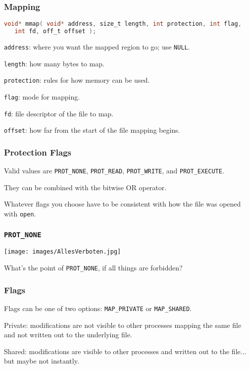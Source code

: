 \begin{frame}[fragile]
	\frametitle{Mapping}
	\begin{lstlisting}[language=C]
void* mmap( void* address, size_t length, int protection, int flag,
   int fd, off_t offset );
\end{lstlisting}

	\texttt{address}: where you want the mapped region to go; use \texttt{NULL}.

	\texttt{length}: how many bytes to map.

	\texttt{protection}: rules for how memory can be used.

	\texttt{flag}: mode for mapping.

	\texttt{fd}: file descriptor of the file to map.

	\texttt{offset}: how far from the start of the file mapping begins.

\end{frame}


\begin{frame}
	\frametitle{Protection Flags}

	Valid values are \texttt{PROT\_NONE}, \texttt{PROT\_READ}, \texttt{PROT\_WRITE}, and \texttt{PROT\_EXECUTE}.

	They can be combined with the bitwise OR operator.

	Whatever flags you choose have to be consistent with how the file was opened with \texttt{open}.

\end{frame}


\begin{frame}
	\frametitle{\texttt{PROT\_NONE}}

	\begin{center}
		\texttt{[image: images/AllesVerboten.jpg]}
	\end{center}

	What's the point of \texttt{PROT\_NONE}, if all things are forbidden?

\end{frame}


\begin{frame}
	\frametitle{Flags}
	Flags can be one of two options: \texttt{MAP\_PRIVATE} or \texttt{MAP\_SHARED}.

	Private: modifications are not visible to other processes mapping the same file and not written out to the underlying file.

	Shared: modifications are visible to other processes and written out to the file... but maybe not instantly.

\end{frame}


